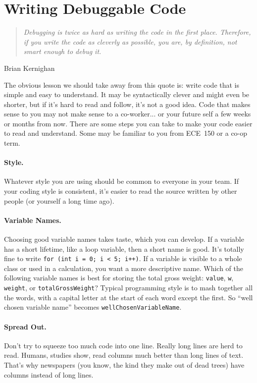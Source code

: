 \section*{Writing Debuggable Code}
\begin{quote}
	\emph{Debugging is twice as hard as writing the code in the first place. Therefore, if you write the code as cleverly as possible, you are, by definition, not smart enough to debug it.} 
\end{quote}
\hfill Brian Kernighan

The obvious lesson we should take away from this quote is: write code that is simple and easy to understand. It may be syntactically clever and might even be shorter, but if it's hard to read and follow, it's not a good idea. Code that makes sense to you may not make sense to a co-worker... or your future self a few weeks or months from now. There are some steps you can take to make your code easier to read and understand. Some may be familiar to you from ECE~150 or a co-op term.

\paragraph{Style.} 
Whatever style you are using should be common to everyone in your team. If your coding style is consistent, it's easier to read the source written by other people (or yourself a long time ago).

\paragraph{Variable Names.} 
Choosing good variable names takes taste, which you can develop. If a variable has a short lifetime, like a loop variable, then a short name
is good. It's totally fine to write {\tt for (int i = 0; i < 5; i++)}. If a variable is visible to a whole class or used in a calculation, you want a more descriptive name. Which of the following variable names is best for storing the total gross weight: \texttt{value}, \texttt{w}, \texttt{weight}, or \texttt{totalGrossWeight}? Typical programming style is to mash together all the words, with a capital letter at the start of each word except the first. So ``well chosen variable name'' becomes \texttt{wellChosenVariableName}.

\paragraph{Spread Out.}
Don't try to squeeze too much code into one line. Really long lines are herd to read. Humans, studies show, read columns much better than long lines of text. That's why newspapers (you know, the kind they make out of dead trees) have columns instead of long lines.

